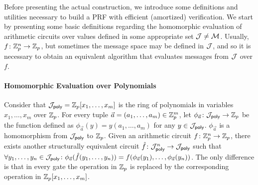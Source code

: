 

Before presenting the actual construction, we introduce some definitions and
utilities necessary to build a PRF with efficient (amortized) verification.
%
We start by presenting some basic
definitions regarding the homomorphic evaluation of arithmetic circuits over
values defined in some appropriate set $\mathcal{J} \neq \mathcal{M}$. Usually,
$\function{f}{\bbZ_p^n}{\bbZ_p}$, but sometimes the message space may be
defined in $\mathcal{J}$, and so it is necessary to obtain an equivalent algorithm
that evaluates messages from $\mathcal{J}$ over $f$.

\paragraph*{Homomorphic Evaluation over Polynomials} Consider that
$\mathcal{J}_{\operatorname{\mathsf{poly}}} = \mathbb{Z}_p[x_1, \dotsc, x_m]$ is the ring of polynomials in
variables $x_1, \dotsc, x_m$ over $\mathbb{Z}_p$. For every tuple $\vec{a} = (a_1,
\dotsc, a_m) \in \mathbb{Z}_p^m$, let
$\function{\phi_{\vec{a}}}{\calJ_{\poly}}{\bbZ_p}$ be the function defined as
$\phi_{\vec{a}}(y) = y(a_1, \dotsc, a_m)$ for any $y \in \mathcal{J}_{\operatorname{\mathsf{poly}}}$.
$\phi_{\vec{a}}$ is a homomorphism from $\mathcal{J}_{\operatorname{\mathsf{poly}}}$ to $\mathbb{Z}_p$.
%
Given an arithmetic circuit $\function{f}{\bbZ_p^n}{\bbZ_p}$, there exists
another structurally equivalent circuit
$\function{\hat{f}}{\calJ_{\poly}^n}{\calJ_{\poly}}$ such that $\forall y_1,
\dotsc, y_n \in \mathcal{J}_{\operatorname{\mathsf{poly}}} \colon \phi_{\vec{a}}(\hat{f}(y_1, \dotsc, y_n))
= f(\phi_{\vec{a}}(y_1), \dotsc, \phi_{\vec{a}}(y_n))$. The only difference is
that in every gate the operation in $\mathbb{Z}_p$ is replaced by the corresponding
operation in $\mathbb{Z}_p[x_1, \dotsc, x_m]$.

